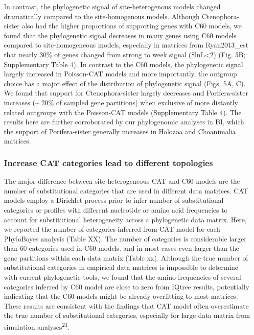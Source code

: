 \documentclass[]{article}
\begin{document}
In contrast, the phylogenetic signal of site-heterogenous models changed
dramatically compared to the site-homogenous models. Although
Ctenophora-sister also had the higher proportions of supporting genes
with C60 models, we found that the phylogenetic signal decreases in many
genes using C60 models compared to site-homogeneous models, especially
in matrices from Ryan2013\_est that nearly 30\% of genes changed from
strong to week signal (\Delta\$lnL\textless{}2) (Fig. 5B; Supplementary
Table 4). In contrast to the C60 models, the phylogenetic signal largely
increased in Poisson-CAT models and more importantly, the outgroup
choice has a major effect of the distribution of phylogenetic signal
(Figs. 5A, C). We found that support for Ctenophora-sister largely
decreases and Porifera-sister increases (\textasciitilde{} 20\% of
sampled gene partitions) when exclusive of more distantly related
outgroups with the Poisson-CAT models (Supplementary Table 4). The
results here are further corroborated by our phylogenomic analyses in
BI, which the support of Porifera-sister generally increases in Holozoa
and Choanimalia matrices.

\hypertarget{increase-cat-categories-lead-to-different-topologies}{%
\subsubsection{Increase CAT categories lead to different
topologies}\label{increase-cat-categories-lead-to-different-topologies}}

The major difference between site-heterogeneous CAT and C60 models are
the number of substitutional categories that are used in different data
matrices. CAT models employ a Dirichlet process prior to infer number of
substitutional categories or profiles with different nucleotide or amino
acid frequencies to account for substitutional heterogeneity across a
phylogenetic data matrix. Here, we reported the number of categories
inferred from CAT model for each PhyloBayes analysis (Table XX). The
number of categories is considerable larger than 60 categories used in
C60 models, and in most cases even larger than the gene partitions
within each data matrix (Table xx). Although the true number of
substitutional categories in empirical data matrices is impossible to
determine with current phylogenetic tools, we found that the amino
frequencies of several categories inferred by C60 model are close to
zero from IQtree results, potentially indicating that the C60 models
might be already overfitting to most matrices. These results are
consistent with the findings that CAT model often overestimate the true
number of substitutional categories, especially for large data matrix
from simulation analyses\textsuperscript{21}.
\end{document}
